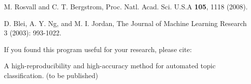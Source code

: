 \documentclass[11pt]{article}
\begin{document}
\vskip0.3cm

\noindent [1] M. Rosvall and  C. T. Bergstrom, Proc. Natl. Acad. Sci. U.S.A {\bf 105}, 1118 (2008).

\vskip0.3cm
\noindent [2] D. Blei, A. Y. Ng, and M. I. Jordan,  The Journal of Machine Learning Research 3 (2003): 993-1022.



\vskip0.3cm
\vskip0.3cm
If you found this program useful for your research, please cite:

\noindent [3] A high-reproducibility and high-accuracy method for automated topic classification. (to be published)

\vskip0.3cm
\end{document}
